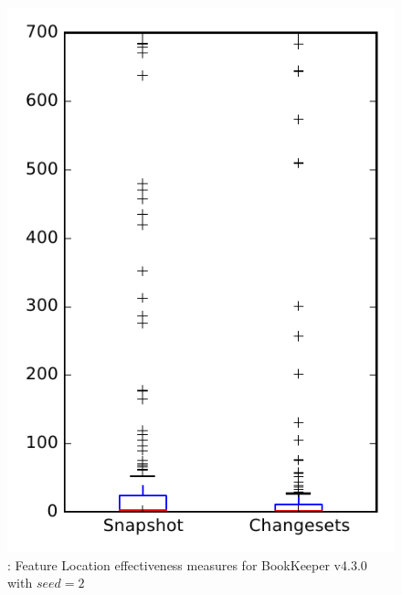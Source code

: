 
\begin{figure}
\centering
\includegraphics[height=0.4\textheight]{figures/flt_seed/rq1_bookkeeper_2}
\caption{\rone: Feature Location effectiveness measures for BookKeeper v4.3.0 with $seed=2$}
\label{fig:flt_seed:rq1:bookkeeper}
\end{figure}
